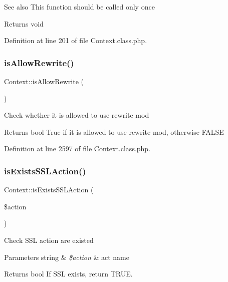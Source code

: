 \begin{DoxySeeAlso}{See also}
This function should be called only once 
\end{DoxySeeAlso}
\begin{DoxyReturn}{Returns}
void 
\end{DoxyReturn}


Definition at line 201 of file Context.\+class.\+php.

\hypertarget{classContext_aa11482b69f0892e9e8013e08c9914ff4}{}\label{classContext_aa11482b69f0892e9e8013e08c9914ff4} 
\subsubsection{\texorpdfstring{is\+Allow\+Rewrite()}{isAllowRewrite()}}
{\footnotesize\ttfamily Context\+::is\+Allow\+Rewrite (\begin{DoxyParamCaption}{ }\end{DoxyParamCaption})}

Check whether it is allowed to use rewrite mod

\begin{DoxyReturn}{Returns}
bool True if it is allowed to use rewrite mod, otherwise F\+A\+L\+SE 
\end{DoxyReturn}


Definition at line 2597 of file Context.\+class.\+php.

\hypertarget{classContext_ada5b689e4d143f371c38091b87cfd864}{}\label{classContext_ada5b689e4d143f371c38091b87cfd864} 
\subsubsection{\texorpdfstring{is\+Exists\+S\+S\+L\+Action()}{isExistsSSLAction()}}
{\footnotesize\ttfamily Context\+::is\+Exists\+S\+S\+L\+Action (\begin{DoxyParamCaption}\item[{}]{\$action }\end{DoxyParamCaption})}

Check S\+SL action are existed


\begin{DoxyParams}[1]{Parameters}
string & {\em \$action} & act name \\
\hline
\end{DoxyParams}
\begin{DoxyReturn}{Returns}
bool If S\+SL exists, return T\+R\+UE. 
\end{DoxyReturn}


